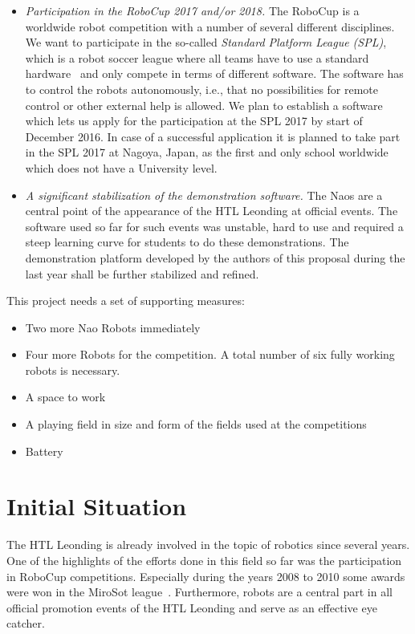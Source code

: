 \documentclass[12pt]{article}
\theoremstyle{definition}
\begin{document}
\begin{itemize}
	\item {\em Participation in the RoboCup 2017 and/or 2018.} The RoboCup is a worldwide robot competition with a number of several different disciplines. We want to participate in the so-called {\em Standard Platform League (SPL)}, which is a robot soccer league where all teams have to use a standard hardware~\cite{softbank_robotics_who_2016} and only compete in terms of different software. The software has to control the robots autonomously, i.e., that no possibilities for remote control or other external help is allowed. We plan to establish a software which lets us apply for the participation at the SPL 2017 by start of December 2016. In case of a successful application it is planned to take part in the SPL 2017 at Nagoya, Japan, as the first and only school worldwide which does not have a University level.
	
	\item {\em A significant stabilization of the demonstration software.} The Naos are a central point of the appearance of the HTL Leonding at official events. The software used so far for such events was unstable, hard to use and required a steep learning curve for students to do these demonstrations. The demonstration platform developed by the authors of this proposal during the last year shall be further stabilized and refined.
\end{itemize}

This project needs a set of supporting measures:

\begin{itemize}
	\item Two more Nao Robots immediately
	\item Four more Robots for the competition. A total number of six fully working robots is necessary.
	\item A space to work
	\item A playing field in size and form of the fields used at the competitions
	\item Battery
\end{itemize}

\section{Initial Situation}
The HTL Leonding is already involved in the topic of robotics since several years. One of the highlights of the efforts done in this field so far was the participation in RoboCup competitions. Especially during the years 2008 to 2010 some awards were won in the MiroSot league~\cite{fira_micro_2014}. Furthermore, robots are a central part in all official promotion events of the HTL Leonding and serve as an effective eye catcher.
\end{document}

